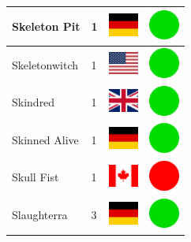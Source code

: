 \documentclass[12pt, a4paper, twoside]{report}
\begin{document}
\begin{center}
\begin{longtable}{|p{5cm}|p{2cm}|p{2cm}|p{2cm}|}
			Skeleton Pit & 1 & \includegraphics[width=1cm]{4x3/de} & \includegraphics[width=1cm]{likes/y} \\ \hline
			Skeletonwitch & 1 & \includegraphics[width=1cm]{4x3/us} & \includegraphics[width=1cm]{likes/y} \\ \hline
			Skindred & 1 & \includegraphics[width=1cm]{4x3/gb} & \includegraphics[width=1cm]{likes/y} \\ \hline
			Skinned Alive & 1 & \includegraphics[width=1cm]{4x3/de} & \includegraphics[width=1cm]{likes/y} \\ \hline
			Skull Fist & 1 & \includegraphics[width=1cm]{4x3/ca} & \includegraphics[width=1cm]{likes/n} \\ \hline
			Slaughterra & 3 & \includegraphics[width=1cm]{4x3/de} & \includegraphics[width=1cm]{likes/y} \\ \hline

\end{longtable}
\end{center}
\end{document}
